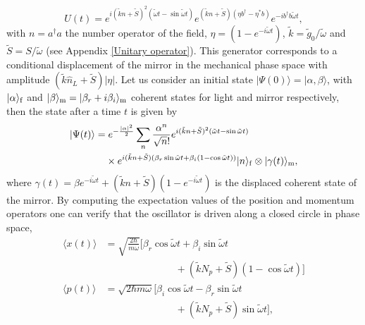 \documentclass[aps,twocolumn,preprintnumbers,amsmath,amssymb]{revtex4}
\newcommand{\ad}{a^{\dag}}
\newcommand{\bd}{b^{\dag}}
\begin{document}
\begin{equation}\label{evolution-operator}
U(t)=e^{i(\tilde{k}n+\tilde{S})^2(\tilde{\omega}t-\sin\tilde{\omega} t)}e^{(\tilde{k}n+\tilde{S})(\eta\bd-\eta^*b)}e^{-i\bd b\tilde{\omega}t},
\end{equation}
with $n=\ad a$ the number operator of the field, $\eta=(1-e^{-i\tilde{\omega}t})$, $\tilde{k}=\tilde{g}_0/\tilde{\omega}$ and $\tilde{S}=S/\tilde{\omega}$ (see Appendix \ref{Unitary operator}). This generator corresponds to a conditional displacement of the mirror in the mechanical phase space with amplitude $(\tilde{k}\hat{n}_L+\tilde{S})|\eta|$. Let us consider an initial state $|\Psi (0)\rangle=|\alpha,\beta\rangle$, with $|\alpha\rangle_{\rm f}$ and $|\beta\rangle_{\rm m}=|\beta_r+i\beta_i\rangle_{\rm m}$ coherent states for light and mirror respectively, then the state after a time $t$ is given by
\begin{equation}\begin{split}\label{state}
|\Psi(t)\rangle=&\;e^{-\frac{|\alpha|^2}{2}}\sum_n\frac{\alpha^n}{\sqrt{n}!}e^{i(\tilde{k}n+\tilde{S})^2(\tilde{\omega}t-\sin\tilde{\omega}t)}\\
&\times e^{i(\tilde{k}n+\tilde{S})(\beta_r\sin\tilde{\omega}t+\beta_i(1-\cos\tilde{\omega} t))}|n\rangle_{\rm f}\otimes|\gamma (t)\rangle_{\rm m},
\end{split}\end{equation}
where $\gamma (t)=\beta e^{-i\tilde{\omega}t}+(\tilde{k}n+\tilde{S})(1-e^{-i\tilde{\omega}t})$ is the displaced coherent state of the mirror. By computing the expectation values of the position and momentum operators one can verify that the oscillator is driven along a closed circle in phase space,
\begin{equation}\label{circle}\begin{split}
\langle x(t)\rangle&=\sqrt{\frac{2\hbar}{m\omega}}[\beta_r\cos\tilde\omega t +\beta_i\sin\tilde\omega t\\
&\hspace{3cm}+(\tilde{k}N_p+\tilde{S})(1-\cos\tilde\omega t)]\\
\langle p(t)\rangle&=\sqrt{2\hbar m\omega}[\beta_i\cos\tilde\omega t -\beta_r\sin\tilde\omega t\\
&\hspace{3cm}+(\tilde{k}N_p +\tilde{S})\sin\tilde\omega t],
\end{split}\end{equation}
\end{document}
